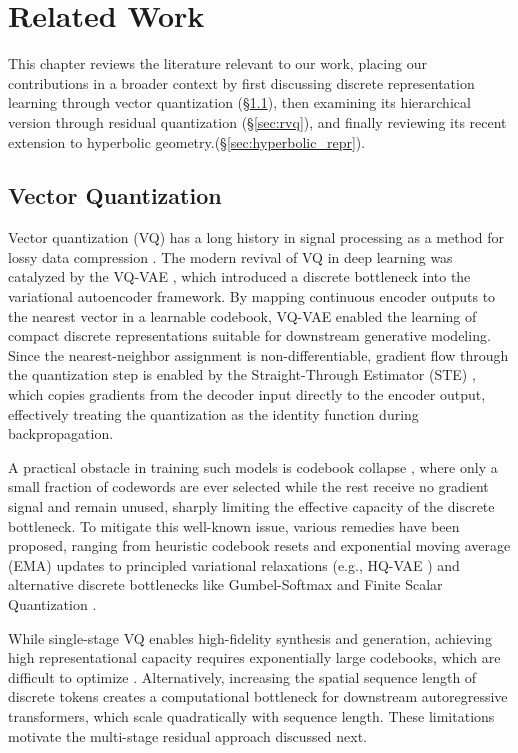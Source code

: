 \documentclass[12pt]{report}
\begin{document}
\chapter{Related Work}

This chapter reviews the literature relevant to our work, placing our contributions in a broader context by first discussing discrete representation learning through vector quantization (\S\ref{sec:vq}), then examining its hierarchical version through residual quantization (\S\ref{sec:rvq}), and finally reviewing its recent extension to hyperbolic geometry.(\S\ref{sec:hyperbolic_repr}).

\section{Vector Quantization}
\label{sec:vq}
Vector quantization (VQ) has a long history in signal processing as a method for lossy data compression \cite{originalvq}. The modern revival of VQ in deep learning was catalyzed by the VQ-VAE \cite{vqvae}, which introduced a discrete bottleneck into the variational autoencoder framework. By mapping continuous encoder outputs to the nearest vector in a learnable codebook, VQ-VAE enabled the learning of compact discrete representations suitable for downstream generative modeling. Since the nearest-neighbor assignment is non-differentiable, gradient flow through the quantization step is enabled by the Straight-Through Estimator (STE) \cite{straight_through_estimator}, which copies gradients from the decoder input directly to the encoder output, effectively treating the quantization as the identity function during backpropagation.

A practical obstacle in training such models is codebook collapse \cite{collapse_1, collapse_2}, where only a small fraction of codewords are ever selected while the rest receive no gradient signal and remain unused, sharply limiting the effective capacity of the discrete bottleneck. To mitigate this well-known issue, various remedies have been proposed, ranging from heuristic codebook resets and exponential moving average (EMA) updates to principled variational relaxations (e.g., HQ-VAE \cite{hqvae}) and alternative discrete bottlenecks like Gumbel-Softmax \cite{gumbelvq} and Finite Scalar Quantization \cite{finitescalarquantizationfsq}.

While single-stage VQ enables high-fidelity synthesis and generation, achieving high representational capacity requires exponentially large codebooks, which are difficult to optimize \cite{soundstream}. Alternatively, increasing the spatial sequence length of discrete tokens creates a computational bottleneck for downstream autoregressive transformers, which scale quadratically with sequence length. These limitations motivate the multi-stage residual approach discussed next.
\end{document}
